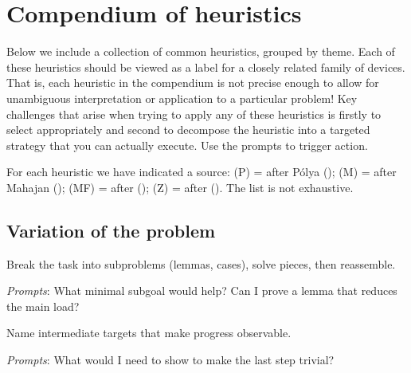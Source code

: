 \documentclass[
  a4paper,
  DIV=11,
  numbers=noendperiod,
  oneside]{scrreprt}
\begin{document}
\section{Compendium of heuristics}\label{compendium-of-heuristics}

Below we include a collection of common heuristics, grouped by theme.
Each of these heuristics should be viewed as a label for a closely
related family of devices. That is, each heuristic in the compendium is
not precise enough to allow for unambiguous interpretation or
application to a particular problem! Key challenges that arise when
trying to apply any of these heuristics is firstly to select
appropriately and second to decompose the heuristic into a targeted
strategy that you can actually execute. Use the prompts to trigger
action.

For each heuristic we have indicated a source: (P) = after Pólya
(); (M) = after Mahajan
(); (MF) = after
();
(Z) = after (). The list is not
exhaustive.

\subsection*{Variation of the problem}\label{variation-of-the-problem}

\begin{tcolorbox}[enhanced jigsaw, colframe=quarto-callout-note-color-frame, title={Decomposing and recombining (P, Z)}, breakable, opacityback=0, titlerule=0mm, colbacktitle=quarto-callout-note-color!10!white, toptitle=1mm, colback=white, coltitle=black, toprule=.15mm, bottomtitle=1mm, left=2mm, arc=.35mm, rightrule=.15mm, bottomrule=.15mm, opacitybacktitle=0.6, leftrule=.75mm]

Break the task into subproblems (lemmas, cases), solve pieces, then
reassemble.

\emph{Prompts}: What minimal subgoal would help? Can I prove a lemma
that reduces the main load?

\end{tcolorbox}

\begin{tcolorbox}[enhanced jigsaw, colframe=quarto-callout-note-color-frame, title={Establishing and using subgoals (P, Z)}, breakable, opacityback=0, titlerule=0mm, colbacktitle=quarto-callout-note-color!10!white, toptitle=1mm, colback=white, coltitle=black, toprule=.15mm, bottomtitle=1mm, left=2mm, arc=.35mm, rightrule=.15mm, bottomrule=.15mm, opacitybacktitle=0.6, leftrule=.75mm]

Name intermediate targets that make progress observable.

\emph{Prompts}: What would I need to show to make the last step trivial?

\end{tcolorbox}
\end{document}
